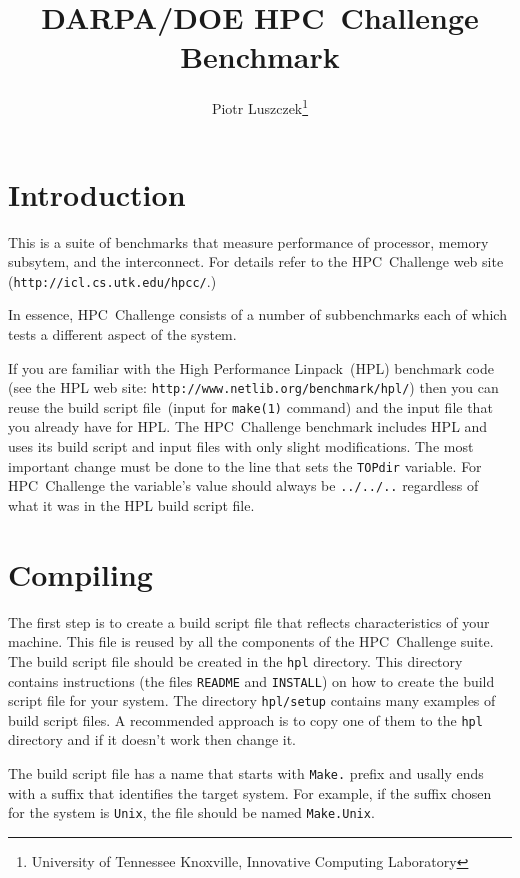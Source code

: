 \documentclass[twocolumn]{article}
\begin{document}
\title{DARPA/DOE HPC~Challenge Benchmark}
\author{Piotr Luszczek\footnote{University of Tennessee Knoxville, Innovative
Computing Laboratory}}
\maketitle

\section{Introduction}
This is a suite of benchmarks that measure performance of processor,
memory subsytem, and the interconnect. For details refer to the
HPC~Challenge web site (\texttt{http://icl.cs.utk.edu/hpcc/}.)

In essence, HPC~Challenge consists of a number of subbenchmarks each
of which tests a different aspect of the system.

If you are familiar with the High Performance Linpack~(HPL) benchmark
code (see the HPL web site:
\texttt{http://www.netlib.org/benchmark/hpl/}) then you can reuse the
build script file~(input for \texttt{make(1)} command) and the input
file that you already have for HPL. The HPC~Challenge benchmark
includes HPL and uses its build script and input files with only
slight modifications. The most important change must be done to the
line that sets the \texttt{TOPdir} variable. For HPC~Challenge the
variable's value should always be \texttt{../../..} regardless of what
it was in the HPL build script file.

\section{Compiling}
The first step is to create a build script file that reflects
characteristics of your machine. This file is reused by all the
components of the HPC~Challenge suite. The build script file should be
created in the \texttt{hpl} directory. This directory contains
instructions (the files \texttt{README} and \texttt{INSTALL}) on how
to create the build script file for your system. The directory
\texttt{hpl/setup} contains many examples of build script files. A
recommended approach is to copy one of them to the \texttt{hpl}
directory and if it doesn't work then change it.

The build script file has a name that starts with \texttt{Make.}
prefix and usally ends with a suffix that identifies the target
system. For example, if the suffix chosen for the system is
\texttt{Unix}, the file should be named \texttt{Make.Unix}.
\end{document}
